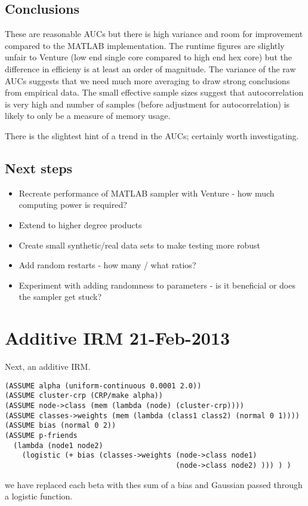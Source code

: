 \documentclass[twoside,11pt]{article}
\begin{document}
\subsection{Conclusions}

These are reasonable AUCs but there is high variance and room for improvement compared to the MATLAB implementation.
The runtime figures are slightly unfair to Venture (low end single core compared to high end hex core) but the difference in efficieny is at least an order of magnitude.
The variance of the raw AUCs suggests that we need much more averaging to draw strong conclusions from empirical data.
The small effective sample sizes suggest that autocorrelation is very high and number of samples (before adjustment for autocorrelation) is likely to only be a measure of memory usage.

There is the slightest hint of a trend in the AUCs; certainly worth investigating.

\subsection{Next steps}

\begin{itemize}
\item Recreate performance of MATLAB sampler with Venture - how much computing power is required?
\item Extend to higher degree products
\item Create small synthetic/real data sets to make testing more robust
\item Add random restarts - how many / what ratios?
\item Experiment with adding randomness to parameters - is it beneficial or does the sampler get stuck?
\end{itemize}

\section{Additive IRM 21-Feb-2013}

Next, an additive IRM.
%
\begin{lstlisting}[frame=single]
(ASSUME alpha (uniform-continuous 0.0001 2.0))
(ASSUME cluster-crp (CRP/make alpha))
(ASSUME node->class (mem (lambda (node) (cluster-crp))))
(ASSUME classes->weights (mem (lambda (class1 class2) (normal 0 1))))
(ASSUME bias (normal 0 2))
(ASSUME p-friends 
  (lambda (node1 node2) 
    (logistic (+ bias (classes->weights (node->class node1) 
                                        (node->class node2) ))) ) ) 
\end{lstlisting}
%
\ie we have replaced each beta with thes sum of a bias and Gaussian passed through a logistic function.
\end{document}
